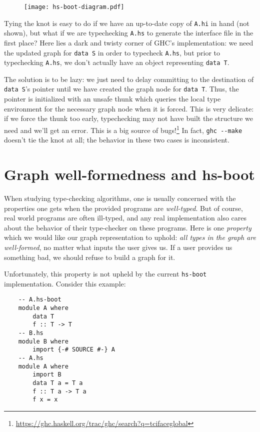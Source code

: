 \begin{figure}[H]
\texttt{[image: hs-boot-diagram.pdf]}
\end{figure}

\noindent
Tying the knot is easy to do if we have an up-to-date copy of \verb|A.hi| in
hand (not shown), but what if we are typechecking \verb|A.hs| to generate the
interface file in the first place?  Here lies a dark and twisty corner
of GHC's implementation: we need the updated graph for \verb|data S| in order to typecheck
\verb|A.hs|, but prior to typechecking \verb|A.hs|, we don't actually have
an object representing \verb|data T|.

The solution is to be lazy: we just need to delay committing to the
destination of \verb|data S|'s pointer until we have created the graph node
for \verb|data T|.  Thus, the pointer is initialized with an unsafe thunk
which queries the local type environment for the necessary graph node
when it is forced.  This
is very delicate: if we force the thunk too early, typechecking may not
have built the structure we need and we'll get an error.  This is a big source of bugs!\footnote{\url{https://ghc.haskell.org/trac/ghc/search?q=tcifaceglobal}}  In fact,
\verb|ghc --make| doesn't tie the knot at all; the behavior in these
two cases is inconsistent.

\section{Graph well-formedness and hs-boot}

When studying type-checking algorithms, one is usually concerned with the
properties one gets when the provided programs are \emph{well-typed}.
But of course, real world programs are often ill-typed, and any real
implementation also cares about the behavior of their type-checker on
these programs.  Here is one \emph{property} which we would like our
graph representation to uphold: \emph{all types in the graph
are well-formed}, no matter what inputs the user gives
us.  If a user provides us something bad, we should refuse to
build a graph for it.

Unfortunately, this property is not upheld by the current \verb|hs-boot|
implementation.  Consider this example:

\begin{verbatim}
    -- A.hs-boot
    module A where
        data T
        f :: T -> T
    -- B.hs
    module B where
        import {-# SOURCE #-} A
    -- A.hs
    module A where
        import B
        data T a = T a
        f :: T a -> T a
        f x = x
\end{verbatim}

